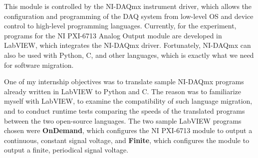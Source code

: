 This module is controlled by the NI-DAQmx instrument driver, which allows the configuration and programming of the DAQ system from low-level OS and device control to high-level programming languages. Currently, for the experiment, programs for the NI PXI-6713 Analog Output module are developed in LabVIEW, which integrates the NI-DAQmx driver. Fortunately, NI-DAQmx can also be used with Python, C, and other languages, which is exactly what we need for software migration.

One of my internship objectives was to translate sample NI-DAQmx programs already written in LabVIEW to Python and C. The reason was to familiarize myself with LabVIEW, to examine the compatibility of such language migration, and to conduct runtime tests comparing the speeds of the translated programs between the two open-source languages. The two sample LabVIEW programs chosen were \textbf{OnDemand}, which configures the NI PXI-6713 module to output a continuous, constant signal voltage, and \textbf{Finite}, which configures the module to output a finite, periodical signal voltage.

